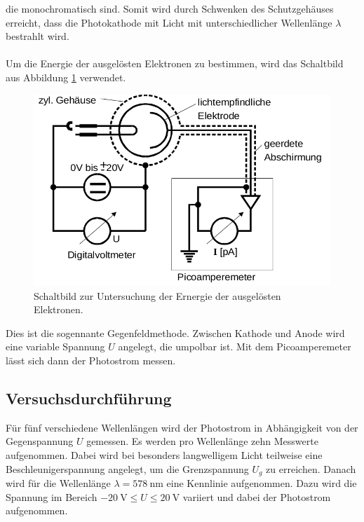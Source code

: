 die monochromatisch sind. Somit wird durch Schwenken des Schutzgehäuses erreicht, dass die Photokathode
mit Licht mit unterschiedlicher Wellenlänge $\lambda$ bestrahlt wird. \\
\\
Um die Energie der ausgelösten Elektronen zu bestimmen, wird das Schaltbild aus Abbildung \ref{fig:4}
verwendet.
\begin{figure}[h]
  \centering
  \includegraphics[scale=0.4]{schaltbild.png}
  \caption{Schaltbild zur Untersuchung der Ernergie der ausgelösten Elektronen.}
  \label{fig:4}
\end{figure}
Dies ist die sogennante Gegenfeldmethode. Zwischen Kathode und Anode wird eine variable
Spannung $U$ angelegt, die umpolbar ist. Mit dem Picoamperemeter lässt sich dann der
Photostrom messen.
\subsection{Versuchsdurchführung}
Für fünf verschiedene Wellenlängen wird der Photostrom in Abhängigkeit von der Gegenspannung
$U$ gemessen. Es werden pro Wellenlänge zehn Messwerte aufgenommen. Dabei wird bei besonders
langwelligem Licht teilweise eine Beschleunigerspannung angelegt, um die Grenzspannung
$U_g$ zu erreichen. Danach wird für die Wellenlänge
$\lambda = \SI{578}{\nano\meter}$ eine Kennlinie aufgenommen. Dazu wird die Spannung
im Bereich $\SI{-20}{\volt} \leq U \leq \SI{20}{\volt}$ variiert und dabei der Photostrom
aufgenommen.

